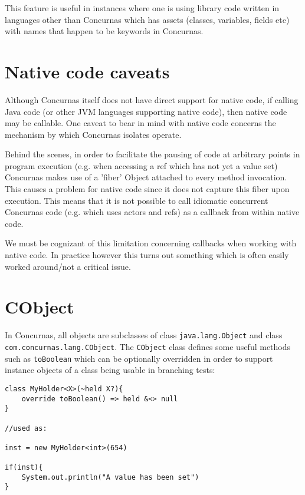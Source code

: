 \documentclass[conc-doc]{subfiles}
\begin{document}
This feature is useful in instances where one is using library code written in languages other than Concurnas which has assets (classes, variables, fields etc) with names that happen to be keywords in Concurnas.

\section{Native code caveats}
Although Concurnas itself does not have direct support for native code, if calling Java code (or other JVM languages supporting native code), then native code may be callable. One caveat to bear in mind with native code concerns the mechanism by which Concurnas isolates operate.

Behind the scenes, in order to facilitate the pausing of code at arbitrary points in program execution (e.g. when accessing a ref which has not yet a value set) Concurnas makes use of a 'fiber' Object attached to every method invocation. This causes a problem for native code since it does not capture this fiber upon execution. This means that it is not possible to call idiomatic concurrent Concurnas code (e.g. which uses actors and refs) as a callback from within native code.

We must be cognizant of this limitation concerning callbacks when working with native code. In practice however this turns out something which is often easily worked around/not a critical issue.

\section{CObject}
In Concurnas, all objects are subclasses of class \lstinline{java.lang.Object} and class \lstinline{com.concurnas.lang.CObject}. The \lstinline{CObject} class defines some useful methods such as \lstinline{toBoolean} which can be optionally overridden in order to support instance objects of a class being usable in branching tests:

\begin{lstlisting}
class MyHolder<X>(~held X?){
	override toBoolean() => held &<> null
}

//used as:

inst = new MyHolder<int>(654)

if(inst){
	System.out.println("A value has been set")
}

\end{lstlisting}
\end{document}
